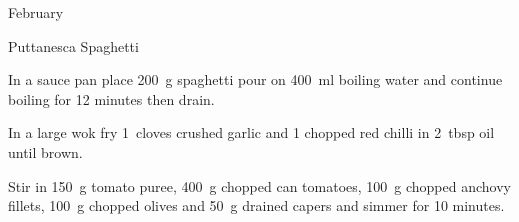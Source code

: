 \begin{menu}{February}
\begin{recipe}{1}{Puttanesca Spaghetti}
\begin{ingredients}
		\end{ingredients}
	
	
	
    \begin{instructions}
    \item 
    In a
    sauce pan
    place
    200~g  spaghetti
    pour on
    400~ml  boiling water and continue boiling for 12 minutes then drain.
  \item 
        In a large wok fry
        1~cloves crushed garlic
        and
        1 chopped red chilli
        in
        2~tbsp  oil
        until brown.
      \item 
        Stir in
        150~g  tomato puree,
        400~g chopped can tomatoes,
        100~g chopped anchovy fillets,
        100~g chopped olives
        and
        50~g drained capers
        and simmer for 10 minutes.
      
    \end{instructions}
    \end{recipe}%
  
    \clearpage
    \end{menu}
	
